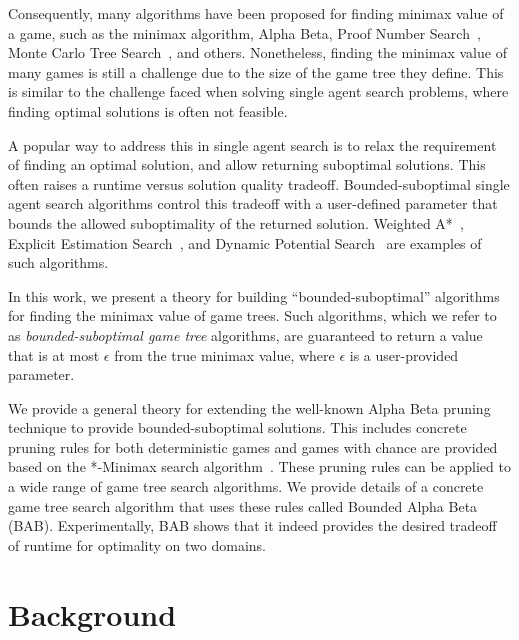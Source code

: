 \documentclass[letterpaper]{article} %
\begin{document}
Consequently, many algorithms have been proposed for finding minimax value of a game, such as the minimax algorithm, Alpha Beta, Proof Number Search~\cite{allis1994proof}, Monte Carlo Tree Search~\cite{coulom2006efficient,kocsis2006bandit,lanctot2013monte}, and others. 
Nonetheless, finding the minimax value of many games is still a challenge due to the size of the game tree they define. This is similar to the challenge faced when solving single agent search problems, where finding optimal solutions is often not feasible. 

A popular way to address this in single agent search is to relax the requirement of finding an optimal solution, and allow returning suboptimal solutions. This often raises a runtime versus solution quality tradeoff. Bounded-suboptimal single agent search algorithms control this tradeoff with a user-defined parameter that bounds the allowed suboptimality of the returned solution. Weighted A*~\cite{pohl1970heuristic}, Explicit Estimation Search~\cite{thayer2011bounded}, and Dynamic Potential Search~\cite{gilon2016dynamic} are examples of such algorithms. 

In this work, we present a theory for building ``bounded-suboptimal'' algorithms for finding the minimax value of game trees. Such algorithms, which we refer to as \emph{bounded-suboptimal game tree} algorithms, are guaranteed to return a value that is at most $\epsilon$ from the true minimax value, where $\epsilon$ is a user-provided parameter. 

We provide a general theory for extending the well-known Alpha Beta pruning technique to provide bounded-suboptimal solutions. This includes concrete pruning rules for both deterministic games and games with chance are provided based on the *-Minimax search algorithm~\cite{ballard1983minimax}. These pruning rules can be applied to a wide range of game tree search algorithms. We provide details of a concrete game tree search algorithm that uses these rules called Bounded Alpha Beta (BAB). Experimentally, BAB shows that it indeed provides the desired tradeoff of runtime for optimality on two domains. 


\section{Background}
\end{document}

